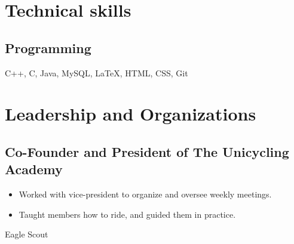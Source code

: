 \documentclass{article}
\begin{document}
\section{Technical skills}

\subsection{Programming}

C++, C, Java, MySQL, {\LaTeX}, HTML, CSS, Git

\section{Leadership and Organizations}
\subsection{Co-Founder and President of The Unicycling Academy}
\begin{itemize}
	\item Worked with vice-president to organize and oversee weekly meetings. 
	\item Taught members how to ride, and guided them in practice.
\end{itemize}
\noindent
Eagle Scout
\end{document}
